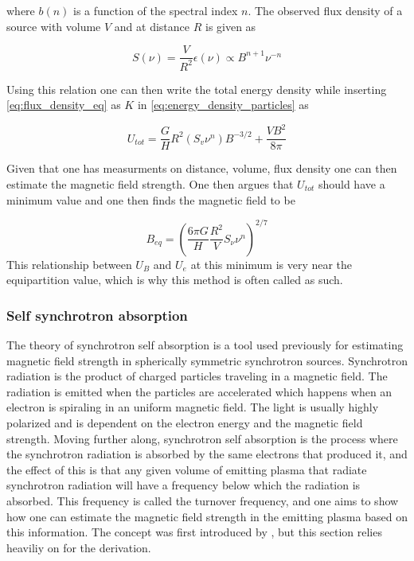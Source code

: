 where $b(n)$ is a function of the spectral index $n$. The observed flux density of a source with volume $V$  and at distance $R$ is given as 

\begin{equation}
    \label{eq:flux_density_eq}
    S(\nu) = \frac{V}{R^2} \epsilon(\nu) \propto B^{n+1} \nu^{-n}
\end{equation}

Using this relation one can then write the total energy density while inserting \ref{eq:flux_density_eq} as $K$ in \ref{eq:energy_density_particles} as

\begin{equation}
    U_{tot} = \frac{G}{H}R^2(S_v\nu^n)B^{-3/2} + \frac{V B^2}{8\pi}
\end{equation}

Given that one has measurments on distance, volume, flux density one can then estimate the magnetic field strength. One then argues that $U_{tot}$ should have a minimum value and one then finds the magnetic field to be 

\begin{equation}
    B_{eq} = \left(\frac{6\pi G}{H}\frac{R^2}{V}S_\nu \nu^n\right)^{2/7}
\end{equation}
This relationship between $U_B$ and $U_e$  at this minimum is very near the equipartition value, which is why this method is often called as such.

\subsubsection{Self synchrotron absorption}
\label{sec:SSA}

The theory of synchrotron self absorption is a tool used previously for estimating magnetic field strength in spherically symmetric synchrotron sources. Synchrotron radiation is the product of charged particles traveling in a magnetic field. The radiation is emitted when the particles are accelerated which happens when an electron is spiraling in an uniform magnetic field. The light is usually highly polarized and is dependent on the electron energy and the magnetic field strength. Moving further along, synchrotron self absorption is the process where the synchrotron radiation is absorbed by the same electrons that produced it, and the effect of this is that any given volume of emitting plasma that radiate synchrotron radiation will have a frequency below which the radiation is absorbed. This frequency is called the turnover frequency, and one aims to show how one can estimate the magnetic field strength in the emitting plasma based on this information. The concept was first introduced by \cite{1983ApJ...264..296M}, but this section relies heaviliy on \cite{Hirotani_2005} for the derivation. 

